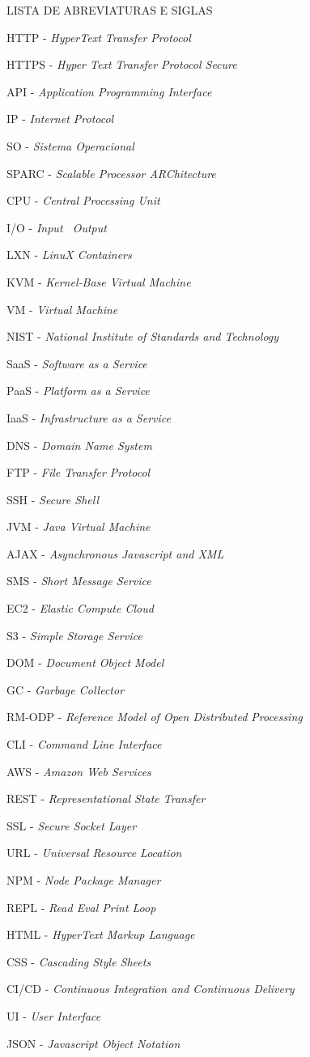 \begin{pretextualsection}{LISTA DE ABREVIATURAS E SIGLAS}

HTTP - \textit{HyperText Transfer Protocol}

HTTPS - \textit{Hyper Text Transfer Protocol Secure }

API - \textit{Application Programming Interface}

IP - \textit{Internet Protocol}

SO - \textit{Sistema Operacional}

SPARC - \textit{Scalable Processor ARChitecture}

CPU - \textit{Central Processing Unit}

I/O - \textit{Input \ Output}

LXN - \textit{LinuX Containers}

KVM - \textit{Kernel-Base Virtual Machine}

VM - \textit{Virtual Machine}

NIST - \textit{National Institute of Standards and Technology}

SaaS - \textit{Software as a Service}

PaaS - \textit{Platform as a Service}

IaaS - \textit{Infrastructure as a Service}

DNS - \textit{Domain Name System}

FTP - \textit{File Transfer Protocol}

SSH - \textit{Secure Shell}

JVM - \textit{Java Virtual Machine}

AJAX - \textit{Asynchronous Javascript and XML}

SMS - \textit{Short Message Service}

EC2 - \textit{Elastic Compute Cloud}

S3 - \textit{Simple Storage Service}

DOM - \textit{Document Object Model}

GC - \textit{Garbage Collector}

RM-ODP - \textit{Reference Model of Open Distributed Processing}

CLI - \textit{Command Line Interface}


AWS - \textit{Amazon Web Services}

REST - \textit{Representational State Transfer}

SSL - \textit{Secure Socket Layer}

URL - \textit{Universal Resource Location}

NPM - \textit{Node Package Manager}

REPL - \textit{Read Eval Print Loop}

HTML - \textit{HyperText Markup Language}

CSS - \textit{Cascading Style Sheets}


CI/CD - \textit{Continuous Integration and Continuous Delivery}

UI - \textit{User Interface}

JSON - \textit{Javascript Object Notation}

\end{pretextualsection}